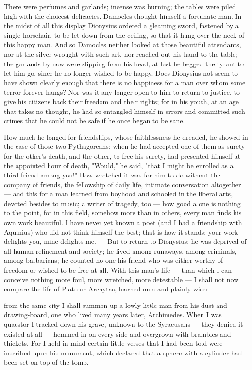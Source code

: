  There were perfumes and garlands; incense was burning; the tables were piled high with the choicest delicacies. Damocles thought himself a fortunate man. In the midst of all this display Dionysius ordered a gleaming sword, fastened by a single horsehair, to be let down from the ceiling, so that it hung over the neck of this happy man. And so Damocles neither looked at those beautiful attendants, nor at the silver wrought with such art, nor reached out his hand to the table; the garlands by now were slipping from his head; at last he begged the tyrant to let him go, since he no longer wished to be happy. Does Dionysius not seem to have shown clearly enough that there is no happiness for a man over whom some terror forever hangs? Nor was it any longer open to him to return to justice, to give his citizens back their freedom and their rights; for in his youth, at an age that takes no thought, he had so entangled himself in errors and committed such crimes that he could not be safe if he once began to be sane.

 How much he longed for friendships, whose faithlessness he dreaded, he showed in the case of those two Pythagoreans: when he had accepted one of them as surety for the other's death, and the other, to free his surety, had presented himself at the appointed hour of death, "Would," he said, "that I might be enrolled as a third friend among you!" How wretched it was for him to do without the company of friends, the fellowship of daily life, intimate conversation altogether — and this for a man learned from boyhood and schooled in the liberal arts, devoted besides to music; a writer of tragedy, too — how good a one is nothing to the point, for in this field, somehow more than in others, every man finds his own work beautiful. I have never yet known a poet (and I had a friendship with Aquinius) who did not think himself the best; that is how it stands: your work delights you, mine delights me. — But to return to Dionysius: he was deprived of all human refinement and society; he lived among runaways, among criminals, among barbarians; he counted no one his friend who was either worthy of freedom or wished to be free at all. With this man's life — than which I can conceive nothing more foul, more wretched, more detestable — I shall not now compare the life of Plato or Archytas, learned men and plainly wise:

 from the same city I shall summon up a lowly little man from his dust and drawing-board, one who lived many years later, Archimedes. When I was quaestor I tracked down his grave, unknown to the Syracusans — they denied it existed at all — hemmed in on every side and overgrown with brambles and thickets. For I held in mind certain little verses that I had been told were inscribed upon his monument, which declared that a sphere with a cylinder had been set on top of the tomb.

